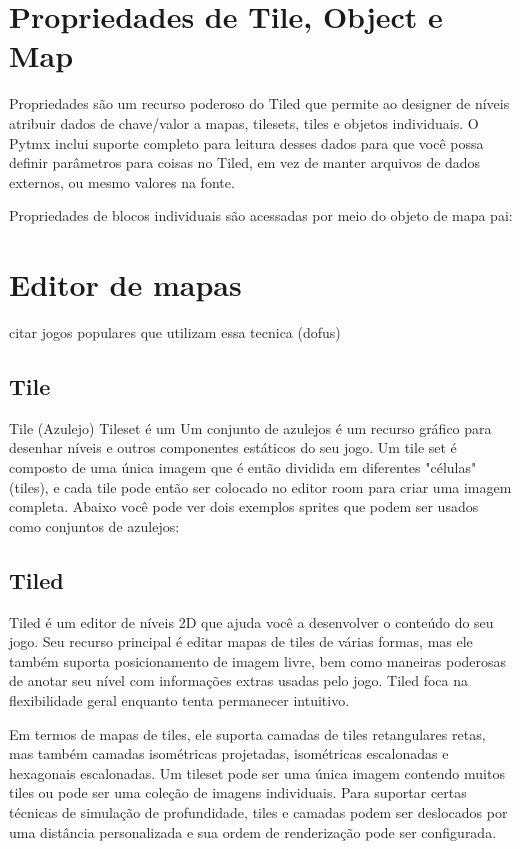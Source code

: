 \section{\textbf{Propriedades de Tile, Object e Map}}

Propriedades são um recurso poderoso do Tiled que permite ao designer de níveis atribuir dados de chave/valor a mapas, tilesets, tiles e objetos individuais. O Pytmx inclui suporte completo para leitura desses dados para que você possa definir parâmetros para coisas no Tiled, em vez de manter arquivos de dados externos, ou mesmo valores na fonte.

Propriedades de blocos individuais são acessadas por meio do objeto de mapa pai:
 

\section{Editor de mapas}
citar jogos populares que utilizam essa tecnica (dofus)
\subsection{Tile}
Tile (Azulejo) 
Tileset é um Um conjunto de azulejos é um recurso gráfico para desenhar níveis e outros componentes estáticos do seu jogo. Um tile set é composto de uma única imagem que é então dividida em diferentes "células" (tiles), e cada tile pode então ser colocado no editor room para criar uma imagem completa. Abaixo você pode ver dois exemplos sprites que podem ser usados como conjuntos de azulejos:
\subsection{Tiled}

Tiled é um editor de níveis 2D que ajuda você a desenvolver o conteúdo do seu jogo. Seu recurso principal é editar mapas de tiles de várias formas, mas ele também suporta posicionamento de imagem livre, bem como maneiras poderosas de anotar seu nível com informações extras usadas pelo jogo. Tiled foca na flexibilidade geral enquanto tenta permanecer intuitivo.

Em termos de mapas de tiles, ele suporta camadas de tiles retangulares retas, mas também camadas isométricas projetadas, isométricas escalonadas e hexagonais escalonadas. Um tileset pode ser uma única imagem contendo muitos tiles ou pode ser uma coleção de imagens individuais. Para suportar certas técnicas de simulação de profundidade, tiles e camadas podem ser deslocados por uma distância personalizada e sua ordem de renderização pode ser configurada.

